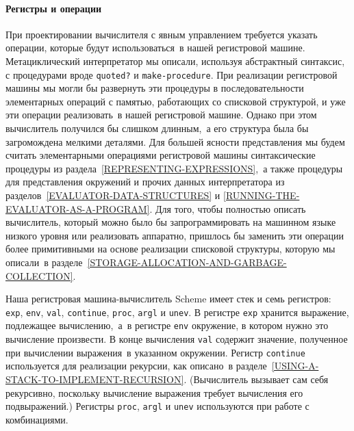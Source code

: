 %

\paragraph{Регистры и операции}


При проектировании вычислителя с
явным управлением требуется 
указать операции, которые будут использоваться~в нашей
регистровой машине.  Метациклический интерпретатор мы описали,
используя абстрактный синтаксис, с процедурами вроде
{\tt quoted?} и {\tt make-procedure}.  При реализации
регистровой машины мы могли бы развернуть эти процедуры в
последовательности элементарных операций с памятью, работающих со
списковой структурой, и уже эти операции реализовать~в нашей
регистровой машине.  Однако при этом вычислитель получился бы слишком
длинным,~а его структура была бы загромождена мелкими деталями.  Для
большей ясности представления мы будем считать элементарными
операциями регистровой машины синтаксические процедуры из 
раздела~\ref{REPRESENTING-EXPRESSIONS},~а также процедуры для
представления окружений и прочих данных интерпретатора из 
разделов~\ref{EVALUATOR-DATA-STRUCTURES} и 
\ref{RUNNING-THE-EVALUATOR-AS-A-PROGRAM}.  Для того, чтобы
полностью описать вычислитель, который можно было бы запрограммировать на
машинном языке низкого уровня или реализовать аппаратно, пришлось бы
заменить эти операции более примитивными на основе реализации
списковой структуры, которую мы описали~в 
разделе~\ref{STORAGE-ALLOCATION-AND-GARBAGE-COLLECTION}.

 Наша регистровая машина-вычислитель Scheme имеет стек и
семь регистров: {\tt exp},
{\tt env}, 
{\tt val},
{\tt continue}, {\tt proc}, {\tt argl} и
{\tt unev}.  В регистре {\tt exp}
хранится выражение,
подлежащее вычислению,~а~в регистре {\tt env}
окружение, в
котором нужно это вычисление произвести. В конце вычисления
{\tt val} содержит значение, полученное при вычислении
выражения~в указанном окружении.  Регистр 
{\tt continue}
используется для реализации рекурсии, как описано~в 
разделе~\ref{USING-A-STACK-TO-IMPLEMENT-RECURSION}.  (Вычислитель
вызывает сам себя рекурсивно, поскольку вычисление выражения требует
вычисления его подвыражений.)  Регистры
{\tt proc}, {\tt argl} и {\tt unev} используются
%
%
%
при работе с комбинациями.


